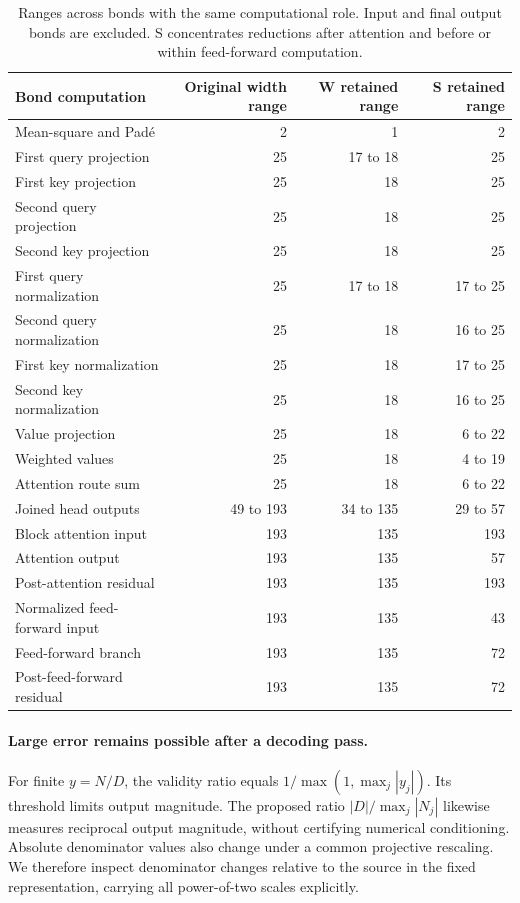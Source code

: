 \documentclass{article}
\begin{document}
\begin{table}[ht]
\centering\small\setlength{\tabcolsep}{7pt}
\begin{tabular}{@{}lrrr@{}}
\toprule
Bond computation & Original width range & W retained range & S retained range\\
\midrule
Mean-square and Pad\'e & 2 & 1 & 2\\
First query projection & 25 & 17 to 18 & 25\\
First key projection & 25 & 18 & 25\\
Second query projection & 25 & 18 & 25\\
Second key projection & 25 & 18 & 25\\
First query normalization & 25 & 17 to 18 & 17 to 25\\
Second query normalization & 25 & 18 & 16 to 25\\
First key normalization & 25 & 18 & 17 to 25\\
Second key normalization & 25 & 18 & 16 to 25\\
Value projection & 25 & 18 & 6 to 22\\
Weighted values & 25 & 18 & 4 to 19\\
Attention route sum & 25 & 18 & 6 to 22\\
Joined head outputs & 49 to 193 & 34 to 135 & 29 to 57\\
Block attention input & 193 & 135 & 193\\
Attention output & 193 & 135 & 57\\
Post-attention residual & 193 & 135 & 193\\
Normalized feed-forward input & 193 & 135 & 43\\
Feed-forward branch & 193 & 135 & 72\\
Post-feed-forward residual & 193 & 135 & 72\\
\bottomrule
\end{tabular}
\caption{Ranges across bonds with the same computational role. Input and final output bonds are excluded. S concentrates reductions after attention and before or within feed-forward computation.}
\label{tab.ranks}
\end{table}

\paragraph{Large error remains possible after a decoding pass.}
For finite $y=N/D$, the validity ratio equals $1/\max(1,\max_j|y_j|)$. Its threshold limits output magnitude. The proposed ratio $|D|/\max_j|N_j|$ likewise measures reciprocal output magnitude, without certifying numerical conditioning. Absolute denominator values also change under a common projective rescaling. We therefore inspect denominator changes relative to the source in the fixed representation, carrying all power-of-two scales explicitly.
\end{document}
